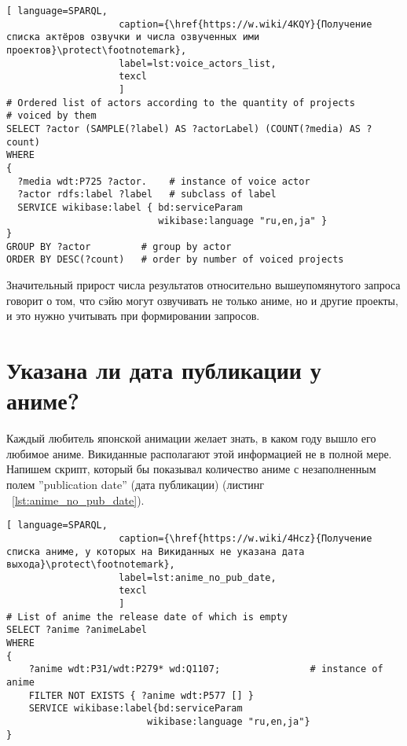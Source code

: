 \begin{lstlisting}[ language=SPARQL, 
                    caption={\href{https://w.wiki/4KQY}{Получение списка актёров озвучки и числа озвученных ими проектов}\protect\footnotemark},
                    label=lst:voice_actors_list,
                    texcl 
                    ]
# Ordered list of actors according to the quantity of projects
# voiced by them
SELECT ?actor (SAMPLE(?label) AS ?actorLabel) (COUNT(?media) AS ?count)
WHERE
{
  ?media wdt:P725 ?actor.	 # instance of voice actor
  ?actor rdfs:label ?label	 # subclass of label
  SERVICE wikibase:label { bd:serviceParam
                           wikibase:language "ru,en,ja" }
}
GROUP BY ?actor		    # group by actor
ORDER BY DESC(?count)	# order by number of voiced projects 
\end{lstlisting}%

Значительный прирост числа результатов относительно вышеупомянутого запроса говорит о том, что сэйю могут озвучивать не только аниме, но и другие проекты, и это нужно учитывать при формировании запросов.

\section{Указана ли дата публикации у аниме?}

Каждый любитель японской анимации желает знать, в каком году вышло его любимое аниме. Викиданные располагают этой информацией не в полной мере. Напишем скрипт, который бы показывал количество аниме с незаполненным полем ''publication date'' (дата публикации) (листинг ~\protect\ref{lst:anime_no_pub_date}). 

\begin{lstlisting}[ language=SPARQL, 
                    caption={\href{https://w.wiki/4Hcz}{Получение списка аниме, у которых на Викиданных не указана дата выхода}\protect\footnotemark},
                    label=lst:anime_no_pub_date,
                    texcl 
                    ]
# List of anime the release date of which is empty
SELECT ?anime ?animeLabel
WHERE
{
    ?anime wdt:P31/wdt:P279* wd:Q1107;                # instance of anime
    FILTER NOT EXISTS { ?anime wdt:P577 [] }
    SERVICE wikibase:label{bd:serviceParam
					     wikibase:language "ru,en,ja"}
}
\end{lstlisting}%

